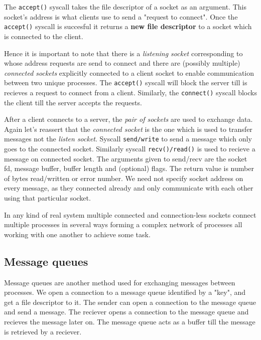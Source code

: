 \documentclass[12pt]{article}
\begin{document}
The \texttt{accept()} syscall takes the file descriptor of a socket as an argument. This socket's address is what clients use to send a "request to connect".
Once the \texttt{accept()} syscall is succesful it returns a \textbf{new file descriptor} to a socket which is connected to the client. 

Hence it is important to note that there is a \textit{listening socket} corresponding to whose address requests are send to connect and there are (possibly multiple)
\textit{connected sockets} explicitly connected to a client socket to enable communication between two unique processes. 
The \texttt{accept()} syscall will block the server till is recieves a request to connect from a client. Similarly, the \texttt{connect()} syscall blocks the client till the server accepts the requests.

After a client connects to a server, the \textit{pair of sockets} are used to exchange data. Again let's reassert that the \textit{connected socket} is the one which is used to transfer messages not the \textit{listen socket}.
Syscall \texttt{send/write} to send a message which only goes to the connected socket.
Similarly syscall \texttt{recv()/read()} is used to recieve a message on connected socket. 
The arguments given to send/recv are the socket fd, message buffer, buffer length and (optional) flags.
The return value is number of bytes read/written or error number.
We need not specify socket address on every message, as they connected already and only communicate with each other using that particular socket.

In any kind of real system multiple connected and connection-less sockets connect multiple processes in several ways forming a complex network of processes all working with one another to achieve some task. 

\subsection{Message queues}
Message queues are another method used for exchanging messages between processes. We open a connection to a message queue identified by a "key", and get a file descriptor to it. The sender can open a connection to
the message queue and send a message. The reciever opens a connection to the message queue and recieves the message later on. The message queue acts as a buffer till the message is retrieved by a reciever.
\end{document}
